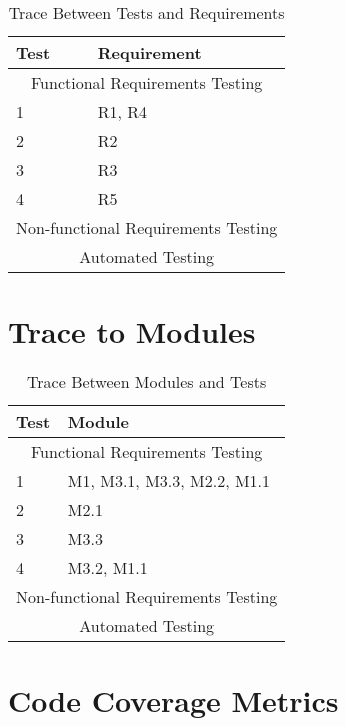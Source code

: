 \documentclass[12pt, titlepage]{article}
\begin{document}
\begin{table}[H!]
\centering
\begin{tabular}{p{} p{}}
\toprule
\textbf{Test} & \textbf{Requirement}\\
\midrule
\multicolumn{2}{c}{Functional Requirements Testing} \\
\midrule
1 & R1, R4 \\
2 & R2 \\
3 & R3 \\
4 & R5 \\
\midrule
\multicolumn{2}{c}{Non-functional Requirements Testing} \\
\midrule

\midrule
\multicolumn{2}{c}{Automated Testing} \\
\midrule
\bottomrule
\end{tabular}
\caption{Trace Between Tests and Requirements}
\label{TblRT}
\end{table}
		
\section{Trace to Modules} %

\begin{table}[H!]
\centering
\begin{tabular}{p{} p{}}
\toprule
\textbf{Test} & \textbf{Module}\\
\midrule
\multicolumn{2}{c}{Functional Requirements Testing} \\
\midrule
1 & M1, M3.1, M3.3, M2.2, M1.1 \\
2 & M2.1 \\
3 & M3.3 \\
4 & M3.2, M1.1 \\
\midrule
\multicolumn{2}{c}{Non-functional Requirements Testing} \\
\midrule

\midrule
\multicolumn{2}{c}{Automated Testing} \\
\midrule
\bottomrule
\end{tabular}
\caption{Trace Between Modules and Tests}
\label{TblRT}
\end{table}

\section{Code Coverage Metrics} %


\end{document}
